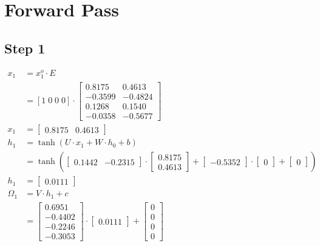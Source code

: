 \documentclass{article}
\begin{document}
\section{Forward Pass}
\subsection{Step 1}

\begin{align*}
    x_1 & = x^o_1 \cdot E \\
    & =  [1 \; 0\; 0\; 0] \cdot \begin{bmatrix}
  0.8175 & 0.4613 \\
 -0.3599 & -0.4824 \\
  0.1268 & 0.1540 \\
 -0.0358 & -0.5677
\end{bmatrix} \\
    x_1 & = \begin{bmatrix}
  0.8175 & 0.4613 
\end{bmatrix} \\
    h_1 & = \tanh(U \cdot x_1 + W \cdot h_0 + b) \\
    & = \tanh\left(\begin{bmatrix}
  0.1442 & -0.2315
\end{bmatrix} \cdot \begin{bmatrix}
  0.8175 \\ 0.4613 
\end{bmatrix} + \begin{bmatrix}
 -0.5352
\end{bmatrix} \cdot \begin{bmatrix} 0 \end{bmatrix} + \begin{bmatrix} 0 \end{bmatrix}\right) \\
    h_1 & = \begin{bmatrix} 0.0111 \end{bmatrix} \\
    \Omega_1 & = V \cdot h_1 + c \\
    & = \begin{bmatrix}
  0.6951 \\
 -0.4402 \\
 -0.2246 \\
 -0.3053
\end{bmatrix} \cdot \begin{bmatrix} 0.0111 \end{bmatrix} + \begin{bmatrix} 0 \\ 0 \\ 0 \\ 0 \end{bmatrix} \\

\end{align*}
\end{document}
